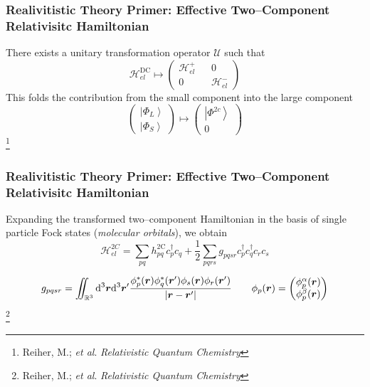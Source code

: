 \documentclass[usepdftitle=false,10pt]{beamer}
\newcommand{\ket}[1]{\left\vert #1 \right\rangle}         %
\newcommand*\vc[1]{\boldsymbol{#1}}
\newcommand*\op[1]{\mathcal{#1}}
\renewcommand*\iint[0]{\int\hspace{-8pt}\int}
\newcommand\blfootnote[1]{%
  \begingroup
  \renewcommand\thefootnote{}\footnote{#1}%
  \addtocounter{footnote}{-1}%
  \endgroup
}
\begin{document}
\begin{frame}
  \frametitle{Realivitistic Theory Primer: Effective Two--Component Relativisitc
  Hamiltonian}

  There exists a unitary transformation operator $\op{U}$ such that
  \begin{equation*}
    \op{H}_{el}^\mathrm{DC} \mapsto 
    \begin{pmatrix} \op{H}_{el}^+ && 0 \\ 0 && \op{H}_{el}^- \end{pmatrix} 
  \end{equation*}
  This folds the contribution from the small component into the large component 
  \begin{equation*}
    \begin{pmatrix} \ket{\Phi_L} \\ \ket{\Phi_S} \end{pmatrix}\mapsto
    \begin{pmatrix} \ket{\Phi^{2c}} \\ 0 \end{pmatrix}
  \end{equation*}
  \blfootnote{\tiny Reiher, M.; \emph{et al}. \emph{Relativistic Quantum Chemistry}}
\end{frame}

\begin{frame}
  \frametitle{Realivitistic Theory Primer: Effective Two--Component Relativisitc
  Hamiltonian}

  Expanding the transformed two--component Hamiltonian in the basis of single
  particle Fock states (\emph{molecular orbitals}), we obtain
  \begin{equation*}
    \op{H}^{2C}_{el} = \sum_{pq}h^\mathrm{2C}_{pq} c_p^\dagger c_q +
    \frac{1}{2}\sum_{pqrs} g_{pqsr}c_p^\dagger c_q^\dagger c_r c_s
  \end{equation*}

  \begin{equation*}
    g_{pqsr} = \iint_{\mathbb{R}^3}\mathrm{d}^3\vc{r} \mathrm{d}^3\vc{r}'
      \frac{\phi^*_p(\vc{r})\phi^*_q(\vc{r}')\phi_s(\vc{r})\phi_r(\vc{r}')}
           {\vert \vc{r} - \vc{r}' \vert} \qquad 
    \phi_p(\vc{r}) = 
      \begin{pmatrix} \phi^\alpha_p(\vc{r}) \\ \phi^\beta_p(\vc{r}) \end{pmatrix}
  \end{equation*}
  \blfootnote{\tiny Reiher, M.; \emph{et al}. \emph{Relativistic Quantum Chemistry}}

\end{frame}
\end{document}

